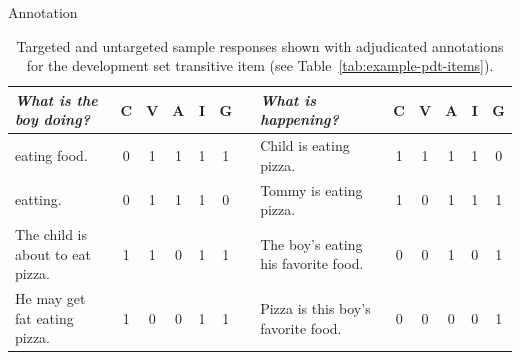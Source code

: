 \documentclass[final,t]{beamer}
\begin{document}
\begin{frame}{}
\begin{columns}[t]
\begin{column}{.33\linewidth}
\begin{block}{Annotation}
\begin{center}
\begin{minipage}{.85\textwidth}

\begin{table}[htb!]
\begin{center}
\begin{tabular}{|l|c|c|c|c|c|c|l|c|c|c|c|c|}
\hline
\textit{What is the boy doing?} & C & V & A & I & G && \textit{What is happening?} & C & V & A & I & G \\
\hline
\hline
eating food. & 0 & 1 & 1 & 1 & 1 && Child is eating pizza. & 1 & 1 & 1 & 1 & 0 \\
\hline
eatting. & 0 & 1 & 1 & 1 & 0 && Tommy is eating pizza. & 1 & 0 & 1 & 1 & 1 \\
\hline
The child is about to eat pizza. & 1 & 1 & 0 & 1 & 1 && The boy's eating his favorite food. & 0 & 0 & 1 & 0 & 1 \\
\hline
He may get fat eating pizza. & 1 & 0 & 0 & 1 & 1 && Pizza is this boy's favorite food. & 0 & 0 & 0 & 0 & 1 \\
\hline
\end{tabular}
\caption{\label{tab:devo-transitive} Targeted and untargeted sample responses shown with adjudicated annotations for the development set transitive item (see Table~\ref{tab:example-pdt-items}).}
\end{center}
\end{table}


\end{minipage}
\end{center}
\end{block}
\end{column}
\end{columns}
\end{frame}
\end{document}
